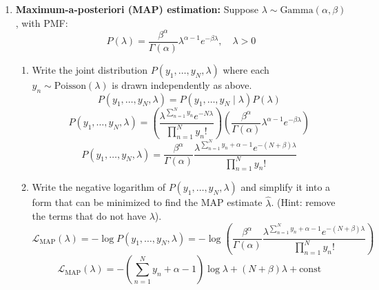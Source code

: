 \documentclass[a3paper,12pt]{extarticle} %
\begin{document}
\begin{enumerate}
\begin{enumerate}
        \item \textbf{Maximum-a-posteriori (MAP) estimation:} Suppose \( \lambda \sim \text{Gamma}(\alpha, \beta) \), with PMF:
        \[
        P(\lambda) = \frac{\beta^\alpha}{\Gamma(\alpha)} \lambda^{\alpha-1} e^{-\beta \lambda}, \quad \lambda > 0
        \]
        \begin{enumerate}
            \item Write the joint distribution \( P(y_1, \ldots, y_N, \lambda) \) where each \( y_n \sim \text{Poisson}(\lambda) \) is drawn independently as above.
            \[
            P(y_1, \ldots, y_N, \lambda) = P(y_1, \ldots, y_N \mid \lambda) P(\lambda)
            \]
            \[
            P(y_1, \ldots, y_N, \lambda) = \left( \frac{\lambda^{\sum_{n=1}^N y_n} e^{-N\lambda}}{\prod_{n=1}^N y_n!} \right) \left( \frac{\beta^\alpha}{\Gamma(\alpha)} \lambda^{\alpha-1} e^{-\beta \lambda} \right)
            \]
            \[
            P(y_1, \ldots, y_N, \lambda) = \frac{\beta^\alpha}{\Gamma(\alpha)} \frac{\lambda^{\sum_{n=1}^N y_n + \alpha - 1} e^{-(N + \beta)\lambda}}{\prod_{n=1}^N y_n!}
            \]

            \item Write the negative logarithm of \( P(y_1, \ldots, y_N, \lambda) \) and simplify it into a form that can be minimized to find the MAP estimate \( \hat{\lambda} \). (Hint: remove the terms that do not have \(\lambda\)).
            \[
            \mathcal{L}_{\text{MAP}}(\lambda) = -\log P(y_1, \ldots, y_N, \lambda) = -\log \left( \frac{\beta^\alpha}{\Gamma(\alpha)} \frac{\lambda^{\sum_{n=1}^N y_n + \alpha - 1} e^{-(N + \beta)\lambda}}{\prod_{n=1}^N y_n!} \right)
            \]
            \[
            \mathcal{L}_{\text{MAP}}(\lambda) = -\left( \sum_{n=1}^N y_n + \alpha - 1 \right) \log \lambda + (N + \beta)\lambda + \text{const}
            \]
        \end{enumerate}
    \end{enumerate}
\end{enumerate}
\newpage
\end{document}
